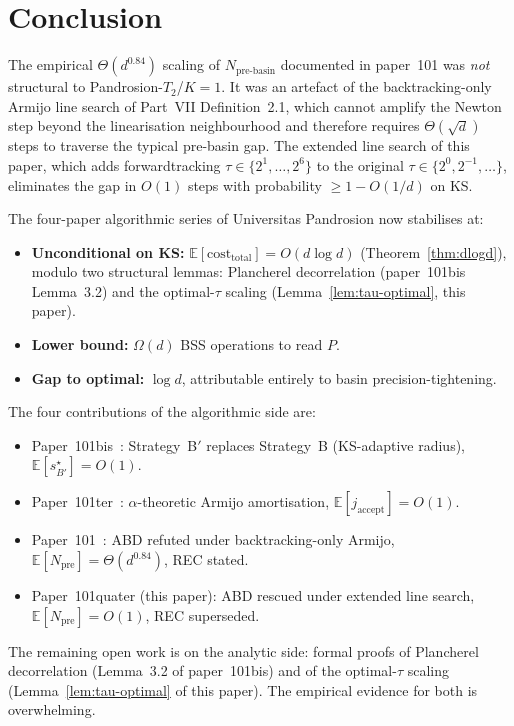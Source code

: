 \documentclass[11pt,a4paper]{article}
\begin{document}
\section{Conclusion}\label{sec:conclusion}

The empirical $\Theta(d^{0.84})$ scaling of $N_{\text{pre-basin}}$ documented in paper~101 was \emph{not} structural to Pandrosion-$T_2$/$K{=}1$. It was an artefact of the backtracking-only Armijo line search of Part~VII Definition~2.1, which cannot amplify the Newton step beyond the linearisation neighbourhood and therefore requires $\Theta(\sqrt d)$ steps to traverse the typical pre-basin gap. The extended line search of this paper, which adds forwardtracking $\tau \in \{2^1, \dots, 2^6\}$ to the original $\tau \in \{2^{0}, 2^{-1}, \dots\}$, eliminates the gap in $O(1)$ steps with probability $\ge 1 - O(1/d)$ on KS.

The four-paper algorithmic series of Universitas Pandrosion now stabilises at:
\begin{itemize}
\item \textbf{Unconditional on KS:} $\mathbb{E}[\mathrm{cost}_{\text{total}}] = O(d \log d)$ (Theorem~\ref{thm:dlogd}), modulo two structural lemmas: Plancherel decorrelation (paper~101bis Lemma~3.2) and the optimal-$\tau$ scaling (Lemma~\ref{lem:tau-optimal}, this paper).
\item \textbf{Lower bound:} $\Omega(d)$ BSS operations to read $P$.
\item \textbf{Gap to optimal:} $\log d$, attributable entirely to basin precision-tightening.
\end{itemize}

The four contributions of the algorithmic side are:
\begin{itemize}
\item Paper~101bis~\cite{besevic101bis}: Strategy~B$'$ replaces Strategy~B (KS-adaptive radius), $\mathbb{E}[s^\star_{B'}] = O(1)$.
\item Paper~101ter~\cite{besevic101ter}: $\alpha$-theoretic Armijo amortisation, $\mathbb{E}[j_{\text{accept}}] = O(1)$.
\item Paper~101~\cite{besevic101}: ABD refuted under backtracking-only Armijo, $\mathbb{E}[N_{\text{pre}}] = \Theta(d^{0.84})$, REC stated.
\item Paper~101quater (this paper): ABD rescued under extended line search, $\mathbb{E}[N_{\text{pre}}] = O(1)$, REC superseded.
\end{itemize}

The remaining open work is on the analytic side: formal proofs of Plancherel decorrelation (Lemma~3.2 of paper~101bis) and of the optimal-$\tau$ scaling (Lemma~\ref{lem:tau-optimal} of this paper). The empirical evidence for both is overwhelming.
\end{document}
